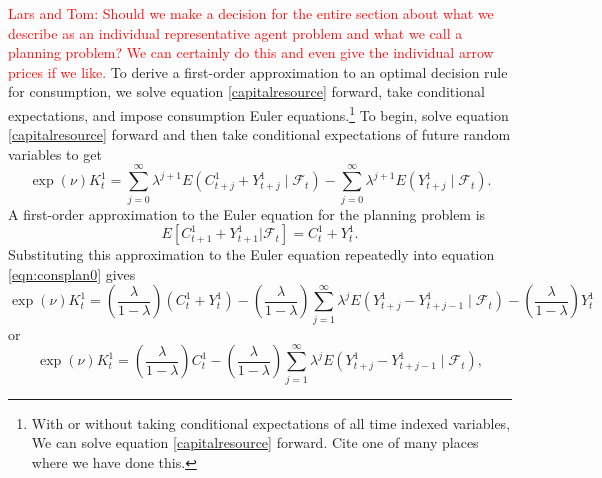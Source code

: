 \documentclass[12pt]{article}
\begin{document}
\textcolor{red}{Lars and Tom: Should we make a decision for the entire section about what we describe as an individual representative agent problem
and what we call a planning problem?  We can certainly do this and even give the individual arrow prices if we like.}
 To derive a first-order approximation to an optimal  decision rule for consumption, %
we solve equation \eqref{capitalresource} forward, take conditional
expectations, and impose consumption Euler equations.\footnote{With or without taking conditional  expectations of all time indexed variables, We can solve equation \eqref{capitalresource} forward. Cite one of many places where we have done this.}
To begin, solve equation \eqref{capitalresource}  forward and then take conditional expectations of future random variables  to get
\begin{equation} \label{eqn:consplan0}
\exp(\nu) K_t^1  =   \sum_{j=0}^\infty \lambda^{j+1}E\left( C_{t+j}^1+ Y_{t+j}^1 \mid {\mathcal F}_t \right) - \sum_{j=0}^\infty \lambda^{j+1} E\left( Y_{t+j}^1 \mid {\mathcal F}_t \right). \end{equation}
%
A first-order approximation to the Euler equation for the planning problem is
\[
E\left[ C_{t+1}^1 + Y_{t+1}^1 \vert {\mathcal F}_t  \right] = C_t^1 + Y_t^1 .
\]
Substituting  this approximation to the Euler equation repeatedly into equation \eqref{eqn:consplan0} gives
\[ \exp(\nu) K_t^1  =  \left({\frac \lambda {1 - \lambda}} \right) (C_t^1 + Y_t^1)  - \left({\frac \lambda {1- \lambda}} \right)  \sum_{j=1}^\infty \lambda^j E\left( Y_{t+j}^1 - Y_{t+j-1}^1 \mid {\mathcal F}_t \right) - \left({\frac {\lambda}  {1-\lambda}} \right) Y_t^1\ \]
or
\begin{equation*}
\exp(\nu) K_t^1=  \left({\frac \lambda {1 - \lambda}} \right) C_t^1 - \left({\frac \lambda {1- \lambda}} \right)  \sum_{j=1}^\infty \lambda^j E\left( Y_{t+j}^1 - Y_{t+j-1}^1 \mid {\mathcal F}_t \right),
\end{equation*}
\end{document}
